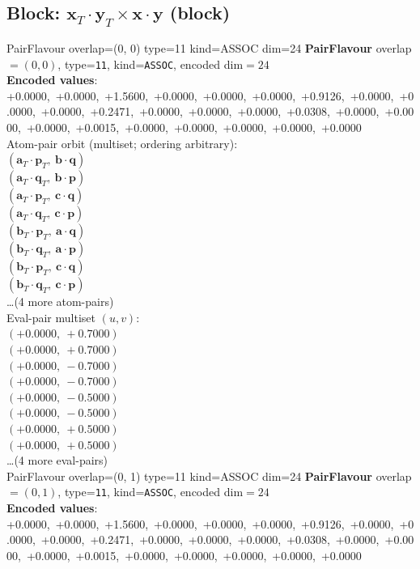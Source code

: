 \documentclass[a4paper,11pt]{article}
\newcommand{\pdcegfomjfhook}[2]{\mathbf{#1} \cdot \mathbf{#2}}
\newcommand{\fpbeomcfokjooi}[2]{\mathbf{#1}_T \cdot \mathbf{#2}_T}
\begin{document}
\subsection{Block: $\fpbeomcfokjooi{x}{y} \times \pdcegfomjfhook{x}{y}$  (block)}
    PairFlavour  overlap=(0, 0)  type=11  kind=ASSOC  dim=24
\textbf{PairFlavour} overlap$=(0, 0)$, type=\texttt{11}, kind=\texttt{ASSOC}, encoded dim$=24$\\
\textbf{      Encoded values}: +0.0000,\ +0.0000,\ +1.5600,\ +0.0000,\ +0.0000,\ +0.0000,\ +0.9126,\ +0.0000,\ +0.0000,\ +0.0000,\ +0.2471,\ +0.0000,\ +0.0000,\ +0.0000,\ +0.0308,\ +0.0000,\ +0.0000,\ +0.0000,\ +0.0015,\ +0.0000,\ +0.0000,\ +0.0000,\ +0.0000,\ +0.0000\\
\quad Atom-pair orbit (multiset; ordering arbitrary):\\
$(\fpbeomcfokjooi{a}{p},\ \pdcegfomjfhook{b}{q})$\\
$(\fpbeomcfokjooi{a}{q},\ \pdcegfomjfhook{b}{p})$\\
$(\fpbeomcfokjooi{a}{p},\ \pdcegfomjfhook{c}{q})$\\
$(\fpbeomcfokjooi{a}{q},\ \pdcegfomjfhook{c}{p})$\\
$(\fpbeomcfokjooi{b}{p},\ \pdcegfomjfhook{a}{q})$\\
$(\fpbeomcfokjooi{b}{q},\ \pdcegfomjfhook{a}{p})$\\
$(\fpbeomcfokjooi{b}{p},\ \pdcegfomjfhook{c}{q})$\\
$(\fpbeomcfokjooi{b}{q},\ \pdcegfomjfhook{c}{p})$\\
\quad \ldots (4 more atom-pairs)\\
\quad Eval-pair multiset $(u, v)$:\\
$(+0.0000,\ +0.7000)$\\
$(+0.0000,\ +0.7000)$\\
$(+0.0000,\ -0.7000)$\\
$(+0.0000,\ -0.7000)$\\
$(+0.0000,\ -0.5000)$\\
$(+0.0000,\ -0.5000)$\\
$(+0.0000,\ +0.5000)$\\
$(+0.0000,\ +0.5000)$\\
\quad \ldots (4 more eval-pairs)\\
    PairFlavour  overlap=(0, 1)  type=11  kind=ASSOC  dim=24
\textbf{PairFlavour} overlap$=(0, 1)$, type=\texttt{11}, kind=\texttt{ASSOC}, encoded dim$=24$\\
\textbf{      Encoded values}: +0.0000,\ +0.0000,\ +1.5600,\ +0.0000,\ +0.0000,\ +0.0000,\ +0.9126,\ +0.0000,\ +0.0000,\ +0.0000,\ +0.2471,\ +0.0000,\ +0.0000,\ +0.0000,\ +0.0308,\ +0.0000,\ +0.0000,\ +0.0000,\ +0.0015,\ +0.0000,\ +0.0000,\ +0.0000,\ +0.0000,\ +0.0000\\
\end{document}
